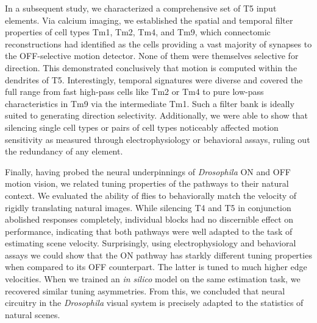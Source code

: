In a subsequent study, we characterized a comprehensive set of T5 input elements. Via calcium imaging, we established the spatial and temporal filter properties of cell types Tm1, Tm2, Tm4, and Tm9, which connectomic reconstructions had identified as the cells providing a vast majority of synapses to the OFF-selective motion detector. None of them were themselves selective for direction. This demonstrated conclusively that motion is computed within the dendrites of T5. Interestingly, temporal signatures were diverse and covered the full range from fast high-pass cells like Tm2 or Tm4 to pure low-pass characteristics in Tm9 via the intermediate Tm1. Such a filter bank is ideally suited to generating direction selectivity. Additionally, we were able to show that silencing single cell types or pairs of cell types noticeably affected motion sensitivity as measured through electrophysiology or behavioral assays, ruling out the redundancy of any element.

Finally, having probed the neural underpinnings of \textit{Drosophila} ON and OFF motion vision, we related tuning properties of the pathways to their natural context. We evaluated the ability of flies to behaviorally match the velocity of rigidly translating natural images. While silencing T4 and T5 in conjunction abolished responses completely, individual blocks had no discernible effect on performance, indicating that both pathways were well adapted to the task of estimating scene velocity. Surprisingly, using electrophysiology and behavioral assays we could show that the ON pathway has starkly different tuning properties when compared to its OFF counterpart. The latter is tuned to much higher edge velocities. When we trained an \textit{in silico} model on the same estimation task, we recovered similar tuning asymmetries. From this, we concluded that neural circuitry in the \textit{Drosophila} visual system is precisely adapted to the statistics of natural scenes.